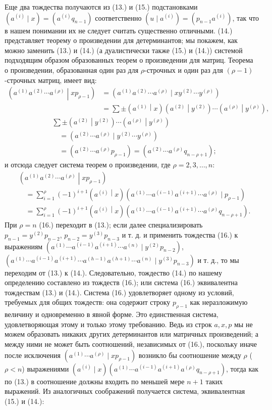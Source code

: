 \documentclass[11pt]{article}
\newcommand{\pair}[2]{\left(#1\middle|#2\right)}
\begin{document}
Еще два тождества получаются из (13.) и (15.) подстановками $(a^{(i)}\mid x)=(a^{(i)}q_{n-1})$ соответственно $(u\mid a^{(i)})=(p_{n-1}a^{(i)})$, так что в нашем понимании их не следует считать существенно отличными. (14.) представляет теорему о произведении для детерминантов; мы покажем, как можно заменить (13.) и (14.) (а дуалистически также (15.) и (14.)) системой подходящим образом образованных теорем о произведении для матриц. Теорема о произведении, образованная один раз для $\rho$-строчных и один раз для $(\rho-1)$-строчных матриц, имеет вид:
\[
\begin{aligned}
\pair{a^{(1)}a^{(2)}\cdots a^{(\rho)}}{xp_{\rho-1}}
&=(a^{(1)}a^{(2)}\cdots a^{(\rho)}\mid xy^{(2)}\cdots y^{(\rho)})\\
&=\sum\pm\pair{a^{(1)}}{x}\pair{a^{(2)}}{y^{(2)}}\cdots\pair{a^{(\rho)}}{y^{(\rho)}},
\end{aligned}
\]
\[
\begin{aligned}
&\sum\pm\pair{a^{(2)}}{y^{(2)}}\cdots\pair{a^{(\rho)}}{y^{(\rho)}}\\
&\quad=(a^{(2)}\cdots a^{(\rho)}\mid y^{(2)}\cdots y^{(\rho)})\\
&\quad=(a^{(2)}\cdots a^{(\rho)}p_{\rho-1})
=(a^{(2)}\cdots a^{(\rho)}q_{n-\rho+1});
\end{aligned}
\]
и отсюда следует система теорем о произведении, где $\rho=2,3,\ldots,n$:
\begin{equation}
\begin{aligned}
&\pair{a^{(1)}a^{(2)}\cdots a^{(\rho)}}{xp_{\rho-1}}\\
&\quad=\sum_{i=1}^{\rho}(-1)^{i+1}\pair{a^{(i)}}{x}
(a^{(1)}\cdots a^{(i-1)}a^{(i+1)}\cdots a^{(\rho)}\mid p_{\rho-1})\\
&\quad=\sum_{i=1}^{\rho}(-1)^{i+1}\pair{a^{(i)}}{x}
(a^{(1)}\cdots a^{(i-1)}a^{(i+1)}\cdots a^{(\rho)}q_{n-\rho+1}).
\end{aligned}
\tag{16}
\end{equation}
При $\rho=n$ (16.) переходит в (13.); если далее специализировать $p_{n-1}=y^{(2)}p_{n-2}$, $p_{n-2}=y^{(3)}p_{n-3}$ и т. д. и применить тождества (16.) к выражениям $(a^{(1)}\cdots a^{(i-1)}a^{(i+1)}\cdots a^{(n)}\mid y^{(2)}p_{n-2})$, $(a^{(1)}\cdots a^{(i-1)}a^{(i+1)}\cdots a^{(h-1)}a^{(h+1)}\cdots a^{(n)}\mid y^{(3)}p_{n-3})$ и т. д., то мы переходим от (13.) к (14.). Следовательно, тождество (14.) по нашему определению составлено из тождеств (16.); или система (16.) эквивалентна тождествам (13.) и (14.). Система (16.) удовлетворяет одному из условий, требуемых для общих тождеств: она содержит строку $p_{\rho-1}$ как неразложимую величину и одновременно в явной форме. Это единственная система, удовлетворяющая этому и только этому требованию. Ведь из строк $a,x,p$ мы не можем образовать никаких других детерминантов или матричных произведений; а между ними не может быть соотношений, независимых от (16.), поскольку иначе после исключения $(a^{(1)}\cdots a^{(\rho)}\mid xp_{\rho-1})$ возникло бы соотношение между $\rho$ ($\rho<n$) выражениями $(a^{(i)}\mid x)(a^{(1)}\cdots a^{(i-1)}a^{(i+1)}a^{(\rho)}q_{n-\rho+1})$, тогда как по (13.) в соотношение должны входить по меньшей мере $n+1$ таких выражений. Из аналогичных соображений получается система, эквивалентная (15.) и (14.):
\end{document}
